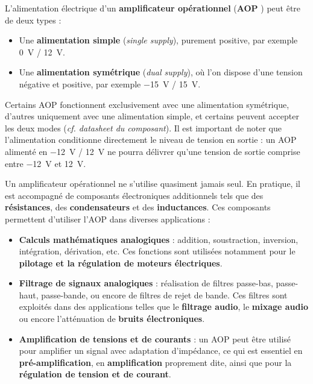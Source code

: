 L'alimentation électrique d'un \textbf{amplificateur opérationnel} (\textbf{AOP}
) peut être de deux types :
\begin{itemize}
    \item Une \textbf{alimentation simple} (\textit{single supply}), purement 
            positive, par exemple \SI{0}{\volt} / \SI{+12}{\volt}.
    \item Une \textbf{alimentation symétrique} (\textit{dual supply}), où l'on 
    dispose d'une tension négative et positive, par exemple \SI{-15}{\volt} / 
    \SI{+15}{\volt}.
\end{itemize}

Certains AOP fonctionnent exclusivement avec une alimentation symétrique, 
d'autres uniquement avec une alimentation simple, et certains peuvent accepter 
les deux modes (\textit{cf. datasheet du composant}). Il est important de noter 
que l'alimentation conditionne directement le niveau de tension en sortie : un 
AOP alimenté en \SI{-12}{\volt} / \SI{+12}{\volt} ne pourra délivrer qu'une 
tension de sortie comprise entre \SI{-12}{\volt} et \SI{+12}{\volt}.

Un amplificateur opérationnel ne s'utilise quasiment jamais seul. En pratique, 
il est accompagné de composants électroniques additionnels tels que des 
\textbf{résistances}, des \textbf{condensateurs} et des \textbf{inductances}. 
Ces composants permettent d'utiliser l'AOP dans diverses applications :
\begin{itemize}
    \item \textbf{Calculs mathématiques analogiques} : addition, soustraction, 
    inversion, intégration, dérivation, etc. Ces fonctions sont utilisées 
    notamment pour le \textbf{pilotage et la régulation de moteurs électriques}.
    \item \textbf{Filtrage de signaux analogiques} : réalisation de filtres 
    passe-bas, passe-haut, passe-bande, ou encore de filtres de rejet de bande. 
    Ces filtres sont exploités dans des applications telles que le 
    \textbf{filtrage audio}, le \textbf{mixage audio} ou encore l'atténuation de 
    \textbf{bruits électroniques}.
    \item \textbf{Amplification de tensions et de courants} : un AOP peut être 
    utilisé pour amplifier un signal avec adaptation d'impédance, ce qui est 
    essentiel en \textbf{pré-amplification}, en \textbf{amplification} 
    proprement dite, ainsi que pour la 
    \textbf{régulation de tension et de courant}.
\end{itemize}

